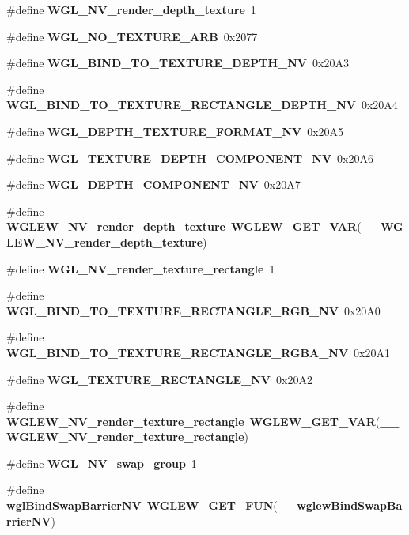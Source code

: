 \begin{DoxyCompactItemize}
\item 
\#define {\bf W\+G\+L\+\_\+\+N\+V\+\_\+render\+\_\+depth\+\_\+texture}~1
\item 
\#define {\bf W\+G\+L\+\_\+\+N\+O\+\_\+\+T\+E\+X\+T\+U\+R\+E\+\_\+\+A\+RB}~0x2077
\item 
\#define {\bf W\+G\+L\+\_\+\+B\+I\+N\+D\+\_\+\+T\+O\+\_\+\+T\+E\+X\+T\+U\+R\+E\+\_\+\+D\+E\+P\+T\+H\+\_\+\+NV}~0x20\+A3
\item 
\#define {\bf W\+G\+L\+\_\+\+B\+I\+N\+D\+\_\+\+T\+O\+\_\+\+T\+E\+X\+T\+U\+R\+E\+\_\+\+R\+E\+C\+T\+A\+N\+G\+L\+E\+\_\+\+D\+E\+P\+T\+H\+\_\+\+NV}~0x20\+A4
\item 
\#define {\bf W\+G\+L\+\_\+\+D\+E\+P\+T\+H\+\_\+\+T\+E\+X\+T\+U\+R\+E\+\_\+\+F\+O\+R\+M\+A\+T\+\_\+\+NV}~0x20\+A5
\item 
\#define {\bf W\+G\+L\+\_\+\+T\+E\+X\+T\+U\+R\+E\+\_\+\+D\+E\+P\+T\+H\+\_\+\+C\+O\+M\+P\+O\+N\+E\+N\+T\+\_\+\+NV}~0x20\+A6
\item 
\#define {\bf W\+G\+L\+\_\+\+D\+E\+P\+T\+H\+\_\+\+C\+O\+M\+P\+O\+N\+E\+N\+T\+\_\+\+NV}~0x20\+A7
\item 
\#define {\bf W\+G\+L\+E\+W\+\_\+\+N\+V\+\_\+render\+\_\+depth\+\_\+texture}~{\bf W\+G\+L\+E\+W\+\_\+\+G\+E\+T\+\_\+\+V\+AR}({\bf \+\_\+\+\_\+\+W\+G\+L\+E\+W\+\_\+\+N\+V\+\_\+render\+\_\+depth\+\_\+texture})
\item 
\#define {\bf W\+G\+L\+\_\+\+N\+V\+\_\+render\+\_\+texture\+\_\+rectangle}~1
\item 
\#define {\bf W\+G\+L\+\_\+\+B\+I\+N\+D\+\_\+\+T\+O\+\_\+\+T\+E\+X\+T\+U\+R\+E\+\_\+\+R\+E\+C\+T\+A\+N\+G\+L\+E\+\_\+\+R\+G\+B\+\_\+\+NV}~0x20\+A0
\item 
\#define {\bf W\+G\+L\+\_\+\+B\+I\+N\+D\+\_\+\+T\+O\+\_\+\+T\+E\+X\+T\+U\+R\+E\+\_\+\+R\+E\+C\+T\+A\+N\+G\+L\+E\+\_\+\+R\+G\+B\+A\+\_\+\+NV}~0x20\+A1
\item 
\#define {\bf W\+G\+L\+\_\+\+T\+E\+X\+T\+U\+R\+E\+\_\+\+R\+E\+C\+T\+A\+N\+G\+L\+E\+\_\+\+NV}~0x20\+A2
\item 
\#define {\bf W\+G\+L\+E\+W\+\_\+\+N\+V\+\_\+render\+\_\+texture\+\_\+rectangle}~{\bf W\+G\+L\+E\+W\+\_\+\+G\+E\+T\+\_\+\+V\+AR}({\bf \+\_\+\+\_\+\+W\+G\+L\+E\+W\+\_\+\+N\+V\+\_\+render\+\_\+texture\+\_\+rectangle})
\item 
\#define {\bf W\+G\+L\+\_\+\+N\+V\+\_\+swap\+\_\+group}~1
\item 
\#define {\bf wgl\+Bind\+Swap\+Barrier\+NV}~{\bf W\+G\+L\+E\+W\+\_\+\+G\+E\+T\+\_\+\+F\+UN}({\bf \+\_\+\+\_\+wglew\+Bind\+Swap\+Barrier\+NV})
\item 

\end{DoxyCompactItemize}
